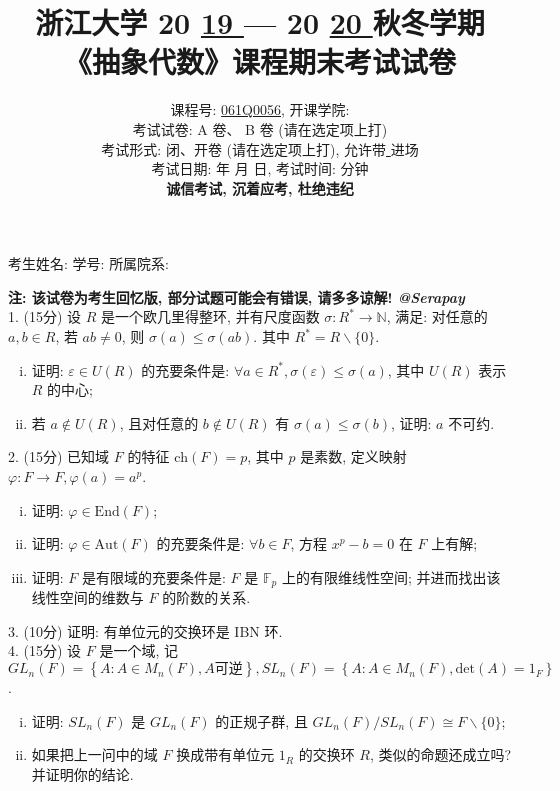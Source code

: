 \documentclass[UTF8]{ctexart}
\title{
\textbf{浙江大学 }20 \underline{ 19 } — 20 \underline{ 20 } \textbf{秋冬学期} \\
\textbf{《抽象代数》课程期末考试试卷}
}
\author{
课程号: \underline{ \quad061Q0056\quad }, 开课学院: \underline{ \quad数学科学学院\quad } \\
考试试卷: \checkmark A 卷、 B 卷 (请在选定项上打\checkmark) \\
考试形式: \checkmark 闭、开卷 (请在选定项上打\checkmark), 允许带\underline{ \quad无\quad  }进场 \\
考试日期: \underline{ \quad2020\quad } 年 \underline{ \quad01\quad } 月 \underline{ \quad17\quad } 日, 考试时间: \underline{ \quad120\quad }分钟 \\
\textbf{诚信考试, 沉着应考, 杜绝违纪}
}
\date{}
\begin{document}
\maketitle

\begin{center}
考生姓名: \underline{\quad\quad\quad\quad\quad\quad\quad\quad\quad\quad}  学号: \underline{\quad\quad\quad\quad\quad\quad\quad\quad\quad\quad}  所属院系: \underline{\quad\quad\quad\quad\quad\quad\quad\quad\quad\quad}
\end{center}

\textbf{注: 该试卷为考生回忆版, 部分试题可能会有错误, 请多多谅解! \textit{@Serapay}}
\\

1. (15分) 设 $R$ 是一个欧几里得整环, 并有尺度函数 $\sigma:R^*\rightarrow\mathbb{N}$, 满足: 对任意的 $a,b\in R$, 若 $ab\neq0$, 则 $\sigma(a)\le\sigma(ab)$. 其中 $R^*=R\backslash\{0\}$.
\begin{enumerate}[(i)]
  \item 证明: $\varepsilon\in U(R)$ 的充要条件是: $\forall a\in R^*, \sigma(\varepsilon)\le\sigma(a)$, 其中 $U(R)$ 表示 $R$ 的中心;
  \item 若 $a\notin U(R)$, 且对任意的 $b\notin U(R)$ 有 $\sigma(a)\le\sigma(b)$, 证明: $a$ 不可约.\\
\end{enumerate}

2. (15分) 已知域 $F$ 的特征 $\text{ch}(F)=p$, 其中 $p$ 是素数, 定义映射 $\varphi:F\rightarrow F, \varphi(a)=a^p$.
\begin{enumerate}[(i)]
  \item 证明: $\varphi\in\text{End}(F)$;
  \item 证明: $\varphi\in\text{Aut}(F)$ 的充要条件是: $\forall b\in F$, 方程 $x^p-b=0$ 在 $F$ 上有解;
  \item 证明: $F$ 是有限域的充要条件是: $F$ 是 $\mathbb{F}_p$ 上的有限维线性空间; 并进而找出该线性空间的维数与 $F$ 的阶数的关系.\\
\end{enumerate}

3. (10分) 证明: 有单位元的交换环是  IBN 环.
\\

4. (15分) 设 $F$ 是一个域, 记 $\displaystyle GL_n(F)=\left\{A:A\in M_n(F), A\text{可逆}\right\}, SL_n(F)=\left\{A:A\in M_n(F), \text{det}(A)=1_F\right\}$.
\begin{enumerate}[(i)]
  \item 证明: $SL_n(F)$ 是 $GL_n(F)$ 的正规子群, 且 $GL_n(F)/SL_n(F)\cong F\backslash\{0\}$;
  \item 如果把上一问中的域 $F$ 换成带有单位元 $1_R$ 的交换环 $R$, 类似的命题还成立吗? 并证明你的结论.\\
\end{enumerate}
\end{document}
